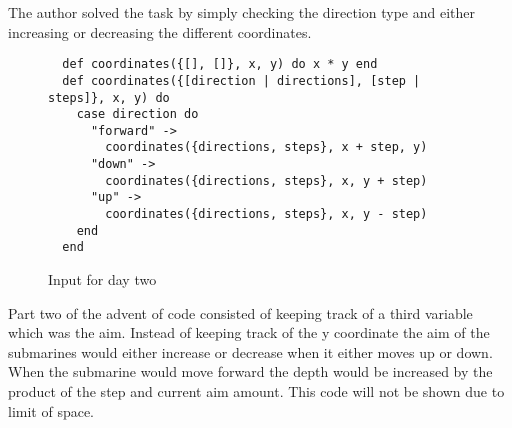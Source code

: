\documentclass[a4paper,11pt]{article}
\begin{document}
The author solved the task by simply checking the direction type and either increasing or decreasing the different coordinates.

\begin{figure}[H]
\begin{verbatim}
  def coordinates({[], []}, x, y) do x * y end
  def coordinates({[direction | directions], [step | steps]}, x, y) do
    case direction do
      "forward" ->
        coordinates({directions, steps}, x + step, y)
      "down" ->
        coordinates({directions, steps}, x, y + step)
      "up" ->
        coordinates({directions, steps}, x, y - step)
    end
  end
\end{verbatim}
\caption{Input for day two}
\label{Figure:6}
\end{figure}

Part two of the advent of code consisted of keeping track of a third variable which was the aim. Instead of keeping track of the y coordinate the aim of the submarines would either increase or decrease when it either moves up or down. When the submarine would move forward the depth would be increased by the product of the step and current aim amount. This code will not be shown due to limit of space.
\end{document}
